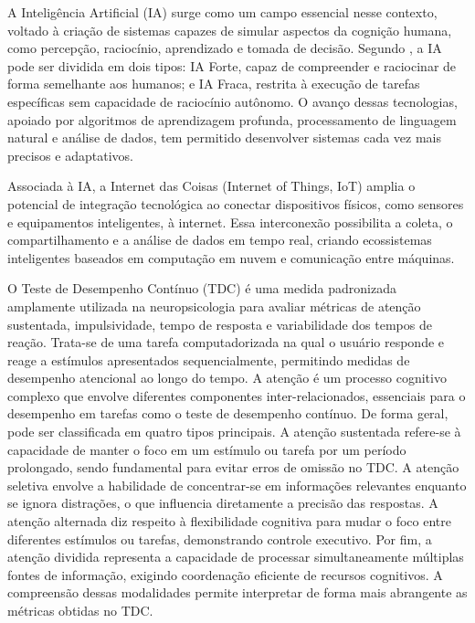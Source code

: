 A Inteligência Artificial (IA) surge como um campo essencial nesse contexto, voltado à criação de sistemas capazes de simular aspectos da cognição humana, como percepção, raciocínio, aprendizado e tomada de decisão. Segundo \textcite{sep-chinese-room}, a IA pode ser dividida em dois tipos: IA Forte, capaz de compreender e raciocinar de forma semelhante aos humanos; e IA Fraca, restrita à execução de tarefas específicas sem capacidade de raciocínio autônomo. O avanço dessas tecnologias, apoiado por algoritmos de aprendizagem profunda, processamento de linguagem natural e análise de dados, tem permitido desenvolver sistemas cada vez mais precisos e adaptativos.

Associada à IA, a Internet das Coisas (Internet of Things, IoT) amplia o potencial de integração tecnológica ao conectar dispositivos físicos, como sensores e equipamentos inteligentes, à internet. Essa interconexão possibilita a coleta, o compartilhamento e a análise de dados em tempo real, criando ecossistemas inteligentes baseados em computação em nuvem e comunicação entre máquinas. \textcite{IEEE}
 
O Teste de Desempenho Contínuo (TDC) é uma medida padronizada amplamente
utilizada na neuropsicologia para avaliar métricas de atenção sustentada, impulsividade,
tempo de resposta e variabilidade dos tempos de reação. Trata-se de uma tarefa
computadorizada na qual o usuário responde e reage a estímulos apresentados
sequencialmente, permitindo medidas de desempenho atencional ao longo do tempo. 
A atenção é um processo cognitivo complexo que envolve diferentes componentes inter-relacionados, essenciais para o desempenho em tarefas como o teste de desempenho contínuo. De forma geral, pode ser classificada em quatro tipos principais. A atenção sustentada refere-se à capacidade de manter o foco em um estímulo ou tarefa por um período prolongado, sendo fundamental para evitar erros de omissão no TDC. A atenção seletiva envolve a habilidade de concentrar-se em informações relevantes enquanto se ignora distrações, o que influencia diretamente a precisão das respostas. A atenção alternada diz respeito à flexibilidade cognitiva para mudar o foco entre diferentes estímulos ou tarefas, demonstrando controle executivo. Por fim, a atenção dividida representa a capacidade de processar simultaneamente múltiplas fontes de informação, exigindo coordenação eficiente de recursos cognitivos. A compreensão dessas modalidades permite interpretar de forma mais abrangente as métricas obtidas no TDC.\textcite{CULLUM1998303}

